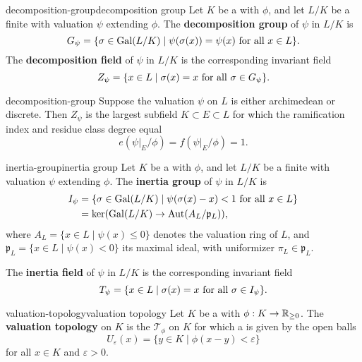 \begin{topic}{decomposition-group}{decomposition group}
    Let $K$ be a  with  $\phi$, and let $L/K$ be a finite  with valuation $\psi$ extending $\phi$. The \textbf{decomposition group} of $\psi$ in $L/K$ is
    \[ G_\psi = \{ \sigma \in \operatorname{Gal}(L/K) \mid \psi(\sigma(x)) = \psi(x) \textup{ for all } x \in L \} . \]
    The \textbf{decomposition field} of $\psi$ in $L/K$ is the corresponding invariant field
    \[ Z_\psi = \{ x \in L \mid \sigma(x) = x \textup{ for all } \sigma \in G_\psi \} . \]
\end{topic}

\begin{example}{decomposition-group}
    Suppose the valuation $\psi$ on $L$ is either archimedean or discrete. Then $Z_\psi$ is the largest subfield $K \subset E \subset L$ for which the ramification index and residue class degree equal
    \[ e(\psi|_E / \phi) = f(\psi|_E / \phi) = 1 . \]
\end{example}

\begin{topic}{inertia-group}{inertia group}
    Let $K$ be a  with  $\phi$, and let $L/K$ be a finite  with valuation $\psi$ extending $\phi$. The \textbf{inertia group} of $\psi$ in $L/K$ is
    \[ \begin{aligned}
        I_\psi &= \{ \sigma \in \operatorname{Gal}(L/K) \mid \psi(\sigma(x) - x) < 1 \textup{ for all } x \in L \} \\
        &= \ker (\operatorname{Gal}(L/K) \to \operatorname{Aut}(A_L / \mathfrak{p}_L)) ,
    \end{aligned} \]
    where $A_L = \{ x \in L \mid \psi(x) \le 0 \}$ denotes the valuation ring of $L$, and $\mathfrak{p}_L = \{ x \in L \mid \psi(x) < 0 \}$ its maximal ideal, with uniformizer $\pi_L \in \mathfrak{p}_L$.
    
    The \textbf{inertia field} of $\psi$ in $L/K$ is the corresponding invariant field
    \[ T_\psi = \{ x \in L \mid \sigma(x) = x \textup{ for all } \sigma \in I_\psi \} . \]
\end{topic}

\begin{topic}{valuation-topology}{valuation topology}
    Let $K$ be a  with  $\phi : K \to \mathbb{R}_{\ge 0}$. The \textbf{valuation topology} on $K$ is the  $\mathcal{T}_\phi$ on $K$ for which a  is given by the open balls
    \[ U_\varepsilon(x) = \{ y \in K \mid \phi(x - y) < \varepsilon \} \]
    for all $x \in K$ and $\varepsilon > 0$.
\end{topic}

